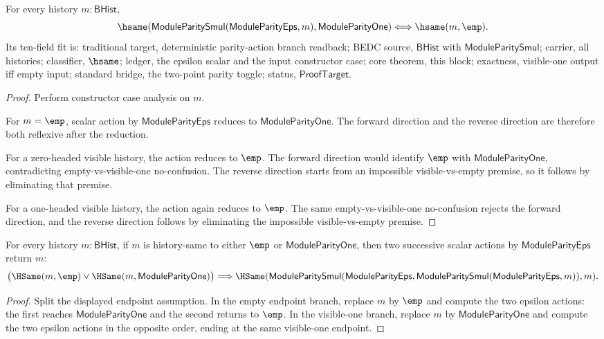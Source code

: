 \begin{theorem}
\label{thm:module-parity-smul-epsilon-visible-one-iff-empty}
For every history $m:\mathsf{BHist}$,
$$
\hsame(\mathsf{ModuleParitySmul}(\mathsf{ModuleParityEps},m),
  \mathsf{ModuleParityOne})
\Longleftrightarrow
\hsame(m,\emp).
$$
Its ten-field fit is: traditional target, deterministic parity-action branch
readback; BEDC source, $\mathsf{BHist}$ with
$\mathsf{ModuleParitySmul}$; carrier, all histories; classifier, $\hsame$;
ledger, the epsilon scalar and the input constructor case; core theorem, this
block; exactness, visible-one output iff empty input; standard bridge, the
two-point parity toggle; status, $\mathsf{ProofTarget}$.
\end{theorem}
\begin{proof}
Perform constructor case analysis on $m$.

For $m=\emp$, scalar action by $\mathsf{ModuleParityEps}$ reduces to
$\mathsf{ModuleParityOne}$. The forward direction and the reverse direction
are therefore both reflexive after the reduction.

For a zero-headed visible history, the action reduces to $\emp$. The forward
direction would identify $\emp$ with $\mathsf{ModuleParityOne}$, contradicting
empty-vs-visible-one no-confusion. The reverse direction starts from an
impossible visible-vs-empty premise, so it follows by eliminating that premise.

For a one-headed visible history, the action again reduces to $\emp$. The same
empty-vs-visible-one no-confusion rejects the forward direction, and the
reverse direction follows by eliminating the impossible visible-vs-empty
premise.
\end{proof}

\begin{theorem}
\label{thm:module-parity-smul-epsilon-boolean-orbit-involutive}
For every history $m:\mathsf{BHist}$, if $m$ is history-same to either
$\emp$ or $\mathsf{ModuleParityOne}$, then two successive scalar actions by
$\mathsf{ModuleParityEps}$ return $m$:
$$
\bigl(\HSame(m,\emp)\lor \HSame(m,\mathsf{ModuleParityOne})\bigr)
\Longrightarrow
\HSame(\mathsf{ModuleParitySmul}(\mathsf{ModuleParityEps},
  \mathsf{ModuleParitySmul}(\mathsf{ModuleParityEps},m)),m).
$$
\end{theorem}
\begin{proof}
Split the displayed endpoint assumption. In the empty endpoint branch, replace
$m$ by $\emp$ and compute the two epsilon actions: the first reaches
$\mathsf{ModuleParityOne}$ and the second returns to $\emp$. In the visible-one
branch, replace $m$ by $\mathsf{ModuleParityOne}$ and compute the two epsilon
actions in the opposite order, ending at the same visible-one endpoint.
\end{proof}

